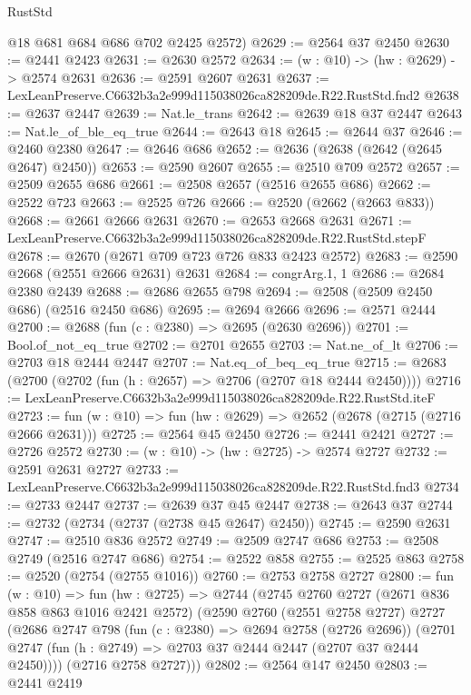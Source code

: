 \begin{lexlean}{RustStd}
\begin{coremodule}
      @18
      @681
      @684
      @686
      @702
      @2425
      @2572)
@2629 := @2564 @37 @2450
@2630 := @2441 @2423
@2631 := @2630 @2572
@2634 := (w : @10) -> (hw : @2629) -> @2574 @2631
@2636 := @2591 @2607 @2631
@2637 := LexLeanPreserve.C6632b3a2e999d115038026ca828209de.R22.RustStd.fnd2
@2638 := @2637 @2447
@2639 := Nat.le_trans
@2642 := @2639 @18 @37 @2447
@2643 := Nat.le_of_ble_eq_true
@2644 := @2643 @18
@2645 := @2644 @37
@2646 := @2460 @2380
@2647 := @2646 @686
@2652 := @2636 (@2638 (@2642 (@2645 @2647) @2450))
@2653 := @2590 @2607
@2655 := @2510 @709 @2572
@2657 := @2509 @2655 @686
@2661 := @2508 @2657 (@2516 @2655 @686)
@2662 := @2522 @723
@2663 := @2525 @726
@2666 := @2520 (@2662 (@2663 @833))
@2668 := @2661 @2666 @2631
@2670 := @2653 @2668 @2631
@2671 := LexLeanPreserve.C6632b3a2e999d115038026ca828209de.R22.RustStd.stepF
@2678 := @2670 (@2671 @709 @723 @726 @833 @2423 @2572)
@2683 := @2590 @2668 (@2551 @2666 @2631) @2631
@2684 := congrArg.{1, 1}
@2686 := @2684 @2380 @2439
@2688 := @2686 @2655 @798
@2694 := @2508 (@2509 @2450 @686) (@2516 @2450 @686)
@2695 := @2694 @2666
@2696 := @2571 @2444
@2700 := @2688 (fun (c : @2380) => @2695 (@2630 @2696))
@2701 := Bool.of_not_eq_true
@2702 := @2701 @2655
@2703 := Nat.ne_of_lt
@2706 := @2703 @18 @2444 @2447
@2707 := Nat.eq_of_beq_eq_true
@2715 := @2683 (@2700 (@2702 (fun (h : @2657) => @2706 (@2707 @18 @2444 @2450))))
@2716 := LexLeanPreserve.C6632b3a2e999d115038026ca828209de.R22.RustStd.iteF
@2723 := fun (w : @10) => fun (hw : @2629) => @2652 (@2678 (@2715 (@2716 @2666 @2631)))
@2725 := @2564 @45 @2450
@2726 := @2441 @2421
@2727 := @2726 @2572
@2730 := (w : @10) -> (hw : @2725) -> @2574 @2727
@2732 := @2591 @2631 @2727
@2733 := LexLeanPreserve.C6632b3a2e999d115038026ca828209de.R22.RustStd.fnd3
@2734 := @2733 @2447
@2737 := @2639 @37 @45 @2447
@2738 := @2643 @37
@2744 := @2732 (@2734 (@2737 (@2738 @45 @2647) @2450))
@2745 := @2590 @2631
@2747 := @2510 @836 @2572
@2749 := @2509 @2747 @686
@2753 := @2508 @2749 (@2516 @2747 @686)
@2754 := @2522 @858
@2755 := @2525 @863
@2758 := @2520 (@2754 (@2755 @1016))
@2760 := @2753 @2758 @2727
@2800 := fun (w : @10) =>
  fun (hw : @2725) =>
  @2744
    (@2745
      @2760
      @2727
      (@2671 @836 @858 @863 @1016 @2421 @2572)
      (@2590
        @2760
        (@2551 @2758 @2727)
        @2727
        (@2686
          @2747
          @798
          (fun (c : @2380) => @2694 @2758 (@2726 @2696))
          (@2701 @2747 (fun (h : @2749) => @2703 @37 @2444 @2447 (@2707 @37 @2444 @2450))))
        (@2716 @2758 @2727)))
@2802 := @2564 @147 @2450
@2803 := @2441 @2419

\end{coremodule}
\end{lexlean}
